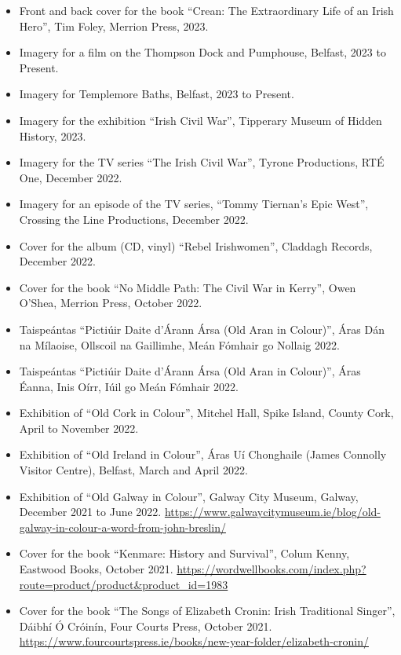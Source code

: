 \documentclass[10pt,a4paper]{res} %
\begin{document}
\begin{resume}
\begin{itemize}
\item Front and back cover for the book ``Crean: The Extraordinary Life of an Irish Hero'', Tim Foley, Merrion Press, 2023.
\item Imagery for a film on the Thompson Dock and Pumphouse, Belfast, 2023 to Present.
\item Imagery for Templemore Baths, Belfast, 2023 to Present.
\item Imagery for the exhibition ``Irish Civil War'', Tipperary Museum of Hidden History, 2023.
\item Imagery for the TV series ``The Irish Civil War'', Tyrone Productions, RT\'{E} One, December 2022.
\item Imagery for an episode of the TV series, ``Tommy Tiernan's Epic West'', Crossing the Line Productions, December 2022.
\item Cover for the album (CD, vinyl) ``Rebel Irishwomen'', Claddagh Records, December 2022.
\item Cover for the book ``No Middle Path: The Civil War in Kerry'', Owen O'Shea, Merrion Press, October 2022.
\item Taispe\'{a}ntas ``Picti\'{u}ir Daite d'\'{A}rann \'{A}rsa (Old Aran in Colour)'', \'{A}ras D\'{a}n na M\'{i}laoise, Ollscoil na Gaillimhe, Me\'{a}n F\'{o}mhair go Nollaig 2022.
\item Taispe\'{a}ntas ``Picti\'{u}ir Daite d'\'{A}rann \'{A}rsa (Old Aran in Colour)'', \'{A}ras \'{E}anna, Inis O\'{i}rr, I\'{uil} go Me\'{a}n F\'{o}mhair 2022.
\item Exhibition of ``Old Cork in Colour'', Mitchel Hall, Spike Island, County Cork, April to November 2022.
\item Exhibition of ``Old Ireland in Colour'', \'{A}ras U\'{i} Chonghaile (James Connolly Visitor Centre), Belfast, March and April 2022.
\item Exhibition of ``Old Galway in Colour'', Galway City Museum, Galway, December 2021 to June 2022. \url{https://www.galwaycitymuseum.ie/blog/old-galway-in-colour-a-word-from-john-breslin/}
\item Cover for the book ``Kenmare: History and Survival'', Colum Kenny, Eastwood Books, October 2021. \url{https://wordwellbooks.com/index.php?route=product/product&product_id=1983}
\item Cover for the book ``The Songs of Elizabeth Cronin: Irish Traditional Singer'', D\'{a}ibh\'{i} \'{O} Cr\'{o}in\'{i}n, Four Courts Press, October 2021. \url{https://www.fourcourtspress.ie/books/new-year-folder/elizabeth-cronin/}

\end{itemize}
\end{resume}
\end{document}
